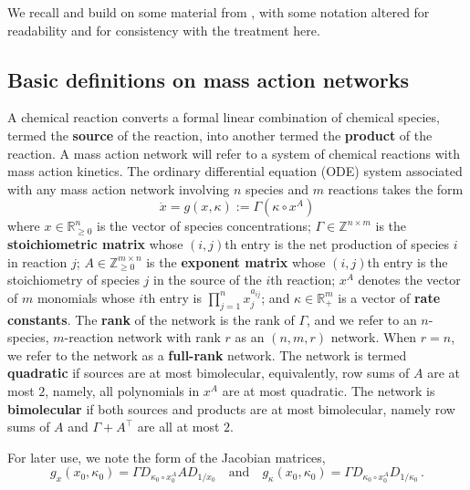 \documentclass[11pt]{amsart}
\renewcommand{\k}{\kappa}
\theoremstyle{definition}
\begin{document}
We recall and build on some material from \cite{BBH2024smallbif,banajifeliu26}, with some notation altered for readability and for consistency with the treatment here. 

\subsection{Basic definitions on mass action networks}
A chemical reaction converts a formal linear combination of chemical species, termed the {\bf source} of the reaction, into another termed the {\bf product} of the reaction. A mass action network will refer to a system of chemical reactions with mass action kinetics. The ordinary differential equation (ODE) system associated with any mass action network involving $n$ species and $m$ reactions takes the form
\begin{equation}
\label{eqODE}
\dot x = g(x,\k):=\Gamma(\k \circ x^A)
\end{equation}
where $x \in \mathbb{R}^n_{\geq 0}$ is the vector of species concentrations; $\Gamma \in \mathbb{Z}^{n \times m}$ is the {\bf stoichiometric matrix} whose $(i,j)$th entry is the net production of species $i$ in reaction $j$; $A \in \mathbb{Z}_{\geq 0}^{m \times n}$ is the {\bf exponent matrix} whose $(i,j)$th entry is the stoichiometry of species $j$ in the source of the $i$th reaction; $x^A$ denotes the vector of $m$ monomials whose $i$th entry is $\prod_{j=1}^n x_j^{a_{ij}}$; and $\k \in \mathbb{R}^m_+$ is a vector of {\bf rate constants}. The {\bf rank} of the network is the rank of $\Gamma$, and we refer to an $n$-species, $m$-reaction network with rank $r$ as an $(n,m,r)$ network. When $r=n$, we refer to the network as a {\bf full-rank} network. The network is termed {\bf quadratic} if sources are at most bimolecular, equivalently, row sums of $A$ are at most $2$, namely, all polynomials in $x^A$ are at most quadratic. The network is {\bf bimolecular} if both sources and products are at most bimolecular, namely row sums of $A$ and $\Gamma + A^\top$ are all at most $2$. 

For later use, we note the form of the Jacobian matrices,
\begin{equation}
\label{eqJstarg}
g_x(x_0, \k_0) = \Gamma D_{\k_0 \circ x_0^A} A D_{1/x_0} \quad \mbox{and} \quad g_{\k}(x_0, \k_0) = \Gamma D_{\k_0 \circ x_0^A} D_{1/\k_0}\,.
\end{equation}
\end{document}
